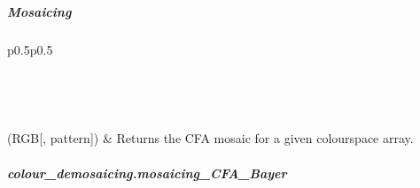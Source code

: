 \documentclass[letterpaper,10pt,english]{sphinxmanual}
\begin{document}
\begin{fulllineitems}
\begin{sphinxVerbatim}[commandchars=\\\{\}]
\PYG{g+go}{       [[ 0.30588236,  0.35686275,  0.3764706 ],}
\PYG{g+go}{        [ 0.29803923,  0.3764706 ,  0.42352942]]])}
\end{sphinxVerbatim}

\end{fulllineitems}



\subparagraph{Mosaicing}
\label{\detokenize{colour_demosaicing.bayer:mosaicing}}


\begin{savenotes}\sphinxatlongtablestart\begin{longtable}{p{0.5\linewidth}p{0.5\linewidth}}
\hline

\endfirsthead

%
{}\\
\hline

\endhead

\hline
{}\\
\endfoot

\endlastfoot

{\hyperref[\detokenize{generated/colour_demosaicing.mosaicing_CFA_Bayer:colour_demosaicing.mosaicing_CFA_Bayer}]{}}(RGB{[}, pattern{]})
&
Returns the  CFA mosaic for a given  colourspace array.
\\
\hline
\end{longtable}\sphinxatlongtableend\end{savenotes}


\subparagraph{colour\_demosaicing.mosaicing\_CFA\_Bayer}
\label{\detokenize{generated/colour_demosaicing.mosaicing_CFA_Bayer:colour-demosaicing-mosaicing-cfa-bayer}}\label{\detokenize{generated/colour_demosaicing.mosaicing_CFA_Bayer::doc}}
\end{document}
